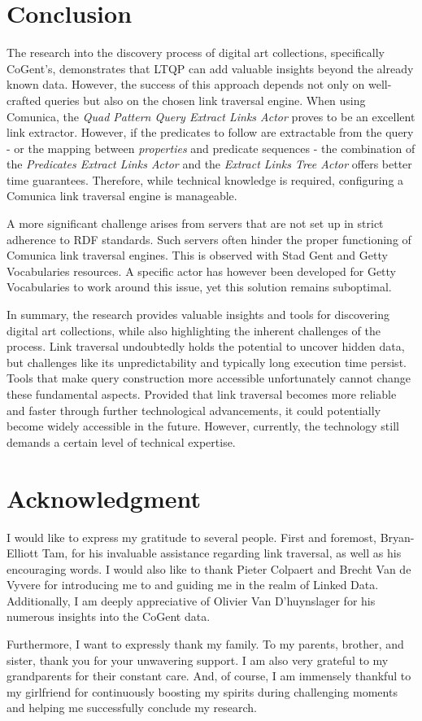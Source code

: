 \documentclass[conference]{IEEEtran}
\begin{document}
\section*{Conclusion}
The research into the discovery process of digital art collections, specifically CoGent's, demonstrates that LTQP can add valuable insights beyond the already known data. However, the success of this approach depends not only on well-crafted queries but also on the chosen link traversal engine. When using Comunica, the \textit{Quad Pattern Query Extract Links Actor} proves to be an excellent link extractor. However, if the predicates to follow are extractable from the query - or the mapping between \textit{properties} and predicate sequences - the combination of the \textit{Predicates Extract Links Actor} and the \textit{Extract Links Tree Actor} offers better time guarantees. Therefore, while technical knowledge is required, configuring a Comunica link traversal engine is manageable.

A more significant challenge arises from servers that are not set up in strict adherence to RDF standards. Such servers often hinder the proper functioning of Comunica link traversal engines. This is observed with Stad Gent and Getty Vocabularies resources. A specific actor has however been developed for Getty Vocabularies to work around this issue, yet this solution remains suboptimal.

In summary, the research provides valuable insights and tools for discovering digital art collections, while also highlighting the inherent challenges of the process. Link traversal undoubtedly holds the potential to uncover hidden data, but challenges like its unpredictability and typically long execution time persist. Tools that make query construction more accessible unfortunately cannot change these fundamental aspects. Provided that link traversal becomes more reliable and faster through further technological advancements, it could potentially become widely accessible in the future. However, currently, the technology still demands a certain level of technical expertise.

\section*{Acknowledgment}
I would like to express my gratitude to several people. First and foremost, Bryan-Elliott Tam, for his invaluable assistance regarding link traversal, as well as his encouraging words. I would also like to thank Pieter Colpaert and Brecht Van de Vyvere for introducing me to and guiding me in the realm of Linked Data. Additionally, I am deeply appreciative of Olivier Van D'huynslager for his numerous insights into the CoGent data.

Furthermore, I want to expressly thank my family. To my parents, brother, and sister, thank you for your unwavering support. I am also very grateful to my grandparents for their constant care. And, of course, I am immensely thankful to my girlfriend for continuously boosting my spirits during challenging moments and helping me successfully conclude my research.



\end{document}
